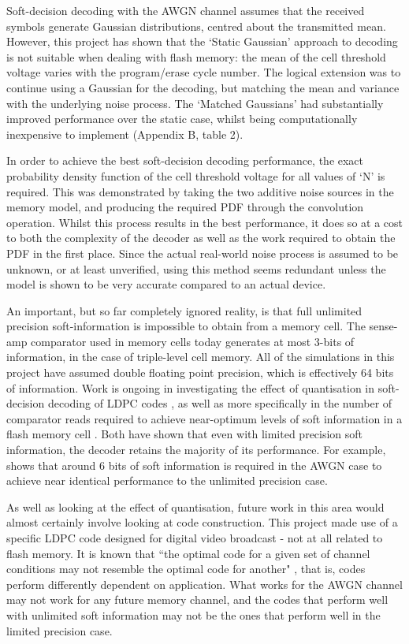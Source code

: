 \documentclass[11pt]{article}
\numberwithin{equation}{subsection}
\begin{document}
Soft-decision decoding with the AWGN channel assumes that the received symbols generate Gaussian distributions, centred about the transmitted mean. However, this project has shown that the `Static Gaussian' approach to decoding is not suitable when dealing with flash memory: the mean of the cell threshold voltage varies with the program/erase cycle number. The logical extension was to continue using a Gaussian for the decoding, but matching the mean and variance with the underlying noise process. The `Matched Gaussians' had substantially improved performance over the static case, whilst being computationally inexpensive to implement (Appendix B, table 2).

In order to achieve the best soft-decision decoding performance, the exact probability density function of the cell threshold voltage for all values of `N' is required. This was demonstrated by taking the two additive noise sources in the memory model, and producing the required PDF through the convolution operation. Whilst this process results in the best performance, it does so at a cost to both the complexity of the decoder as well as the work required to obtain the PDF in the first place. Since the actual real-world noise process is assumed to be unknown, or at least unverified, using this method seems redundant unless the model is shown to be very accurate compared to an actual device. 

An important, but so far completely ignored reality, is that full unlimited precision soft-information is impossible to obtain from a memory cell. The sense-amp comparator used in memory cells today generates at most 3-bits of information, in the case of triple-level cell memory. All of the simulations in this project have assumed double floating point precision, which is effectively 64 bits of information. Work is ongoing in investigating the effect of quantisation in soft-decision decoding of LDPC codes \cite{zhao2005implementation}, as well as more specifically in the number of comparator reads required to achieve near-optimum levels of soft information in a flash memory cell \cite{DBLP:journals/corr/abs-1210-0149}. Both have shown that even with limited precision soft information, the decoder retains the majority of its performance. For example, \cite{zhao2005implementation} shows that around 6 bits of soft information is required in the AWGN case to achieve near identical performance to the unlimited precision case. 

As well as looking at the effect of quantisation, future work in this area would almost certainly involve looking at code construction. This project made use of a specific LDPC code designed for digital video broadcast - not at all related to flash memory. It is known that ``the optimal code for a given set of channel conditions may not resemble the optimal code for another" \cite[p. 369]{golomb1994basic}, that is,  codes perform differently dependent on application. What works for the AWGN channel may not work for any future memory channel, and the codes that perform well with unlimited soft information may not be the ones that perform well in the limited precision case.
\end{document}
